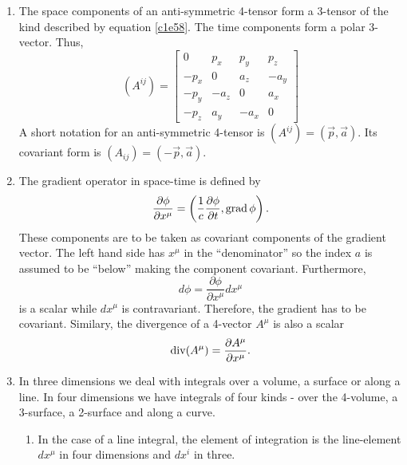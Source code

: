 \begin{enumerate}
\item The space components of an anti-symmetric 4-tensor form a 3-tensor of the 
kind described by equation \eqref{c1e58}. The time components form a polar 
3-vector. Thus,
\begin{equation}\label{c1e64}
(A^{ij}) = \begin{bmatrix} 0 & p_x & p_y & p_z \\
-p_x & 0 & a_z & -a_y \\
-p_y & -a_z & 0 & a_x \\
-p_z & a_y & -a_x & 0
\end{bmatrix}
\end{equation}
A short notation for an anti-symmetric 4-tensor is $(A^{ij}) = (\vec{p}, 
\vec{a})$.  Its covariant form is $(A_{ij}) = (-\vec{p}, \vec{a})$.

\item The gradient operator in space-time is defined by
\begin{equation}\label{c1e65}
\frac{\partial\phi}{\partial x^\mu} = 
\left(\frac{1}{c}\frac{\partial\phi}{\partial t}, \operatorname{grad}\phi\right).
\end{equation}
These components are to be taken as covariant components of the gradient vector.
The left hand side has $x^\mu$ in the ``denominator'' so the index $a$ is 
assumed to be ``below'' making the component covariant. Furthermore,
\begin{equation}\label{c1e66}
d\phi = \frac{\partial\phi}{\partial x^\mu}dx^\mu
\end{equation}
is a scalar while $dx^\mu$ is contravariant. Therefore, the gradient has to be
covariant. Similary, the divergence of a 4-vector $A^\mu$ is also a scalar
\begin{equation}\label{c1e67}
\operatorname{div}(A^\mu) = \frac{\partial A^\mu}{\partial x^\mu}.
\end{equation}

\item In three dimensions we deal with integrals over a volume, a surface or
along a line. In four dimensions we have integrals of four kinds - over the
4-volume, a 3-surface, a 2-surface and along a curve.
\begin{enumerate}
\item In the case of a line integral, the element of integration is the 
line-element $dx^\mu$ in four dimensions and $dx^i$ in three.


\end{enumerate}
\end{enumerate}
